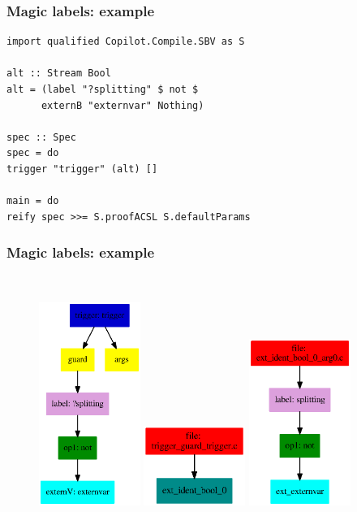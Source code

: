 \documentclass{beamer}
\begin{document}
\begin{frame}[fragile]
	\frametitle{Magic labels: example}
\begin{verbatim}
import qualified Copilot.Compile.SBV as S

alt :: Stream Bool
alt = (label "?splitting" $ not $ 
      externB "externvar" Nothing)

spec :: Spec
spec = do
trigger "trigger" (alt) []

main = do
reify spec >>= S.proofACSL S.defaultParams
\end{verbatim}


\end{frame}

\begin{frame}[fragile]
	\frametitle{Magic labels: example}
	~\\
	\begin{figure}
		\includegraphics[width=33mm]{images/label/main.ps}
		\centering
		\includegraphics[width=33mm]{images/label/splitted.ps}
		\includegraphics[width=33mm]{images/label/splitted2.ps}
	\end{figure}
	
\end{frame}
\end{document}
